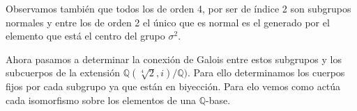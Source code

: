 \documentclass{article}
\theoremstyle{theorem-style}  %
\theoremstyle{definition-style}
\theoremstyle{example-style}
\begin{document}
Observamos también que todos los de orden 4, por ser de índice 2 son subgrupos normales y entre los de orden 2 el único que es normal es el generado por el elemento que está el centro del grupo $\sigma^2$. 



Ahora pasamos a determinar la conexión de Galois entre estos subgrupos y los subcuerpos de la extensión $\mathbb{Q}(\sqrt[4]{2},i)/\mathbb{Q})$. Para ello determinamos los cuerpos fijos por cada subgrupo ya que están en biyección. Para elo vemos como actúa cada isomorfismo sobre los elementos de una $\mathbb{Q}$-base.






\printbibliography
\end{document}
